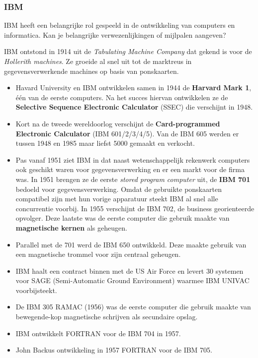 \documentclass[../main.tex]{subfiles}
\begin{document}
\subsubsection{IBM}
\begin{question}
IBM heeft een belangrijke rol gespeeld in de ontwikkeling van computers en informatica. Kan je belangrijke verwezenlijkingen of mijlpalen aangeven?
\end{question}
\begin{solution}
IBM ontstond in 1914 uit de \emph{Tabulating  Machine  Company} dat gekend is voor de \emph{Hollerith machines}. Ze groeide al snel uit tot de marktreus in gegevensverwerkende machines op basis van ponskaarten.
\begin{itemize}
	\item Havard University en IBM ontwikkelen samen in 1944 de \textbf{Harvard Mark 1}, \'e\'en van de eerste computers. Na het succes hiervan ontwikkelen ze de \textbf{Selective Sequence Electronic Calculator} (SSEC) die verschijnt in 1948.
	\item Kort na de tweede wereldoorlog verschijnt de \textbf{Card-programmed Electronic Calculator} (IBM 601/2/3/4/5). Van de IBM 605 werden er tussen 1948 en 1985 maar liefst 5000 gemaakt en verkocht.
	\item Pas vanaf 1951 ziet IBM in dat naast wetenschappelijk rekenwerk computers ook geschikt waren voor gegevensverwerking en er een markt voor de firma was. In 1951 brengen ze de eerste \emph{stored program computer} uit, de \textbf{IBM 701} bedoeld voor gegevensverwerking. Omdat de gebruikte ponskaarten compatibel zijn met hun vorige apparatuur steekt IBM al snel alle concurrentie voorbij. In 1955 verschijnt de IBM 702, de business georienteerde opvolger. Deze laatste was de eerste computer die gebruik maakte van \textbf{magnetische kernen} als geheugen.
	\item Parallel met de 701 werd de IBM 650 ontwikkeld. Deze maakte gebruik van een magnetische trommel voor zijn centraal geheugen.
	\item IBM haalt een contract binnen met de US Air Force en levert 30 systemen voor SAGE (Semi-Automatic Ground Environment) waarmee IBM UNIVAC voorbijsteekt.
	\item De IBM 305 RAMAC (1956) was de eerste computer die gebruik maakte van bewegende-kop magnetische schrijven als secundaire opslag.
	\item IBM ontwikkelt FORTRAN voor de IBM 704 in 1957.
	\item John Backus ontwikkeling in 1957 FORTRAN voor de IBM 705.

\end{itemize}
\end{solution}
\end{document}
